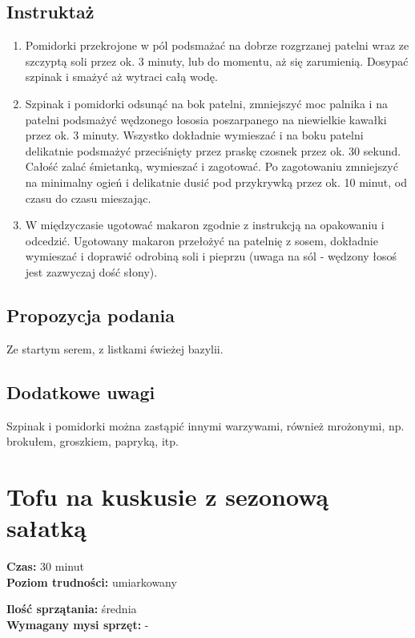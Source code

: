 \documentclass[a4paper,10pt]{book}
\begin{document}
\subsection*{Instruktaż} 
\begin{enumerate} 
    \item Pomidorki przekrojone w pól podsmażać na dobrze rozgrzanej patelni wraz ze szczyptą soli przez ok. 3 minuty, lub do momentu, aż się zarumienią. Dosypać szpinak i smażyć aż wytraci całą wodę.
    \item Szpinak i pomidorki odsunąć na bok patelni, zmniejszyć moc palnika i na patelni podsmażyć wędzonego łososia poszarpanego na niewielkie kawałki przez ok. 3 minuty. Wszystko dokładnie wymieszać i na boku patelni delikatnie podsmażyć przeciśnięty przez praskę czosnek przez ok. 30 sekund. Całość zalać śmietanką, wymieszać i zagotować. Po zagotowaniu zmniejszyć na minimalny ogień i delikatnie dusić pod przykrywką przez ok. 10 minut, od czasu do czasu mieszając. 
    \item W międzyczasie ugotować makaron zgodnie z instrukcją na opakowaniu i odcedzić. Ugotowany makaron przełożyć na patelnię z sosem, dokładnie wymieszać i doprawić odrobiną soli i pieprzu (uwaga na sól - wędzony łosoś jest zazwyczaj dość słony).
\end{enumerate}

\vspace{0.5cm}

\small 
\subsection*{Propozycja podania} Ze startym serem, z listkami świeżej bazylii.

\vspace{0.3cm}

\subsection*{Dodatkowe uwagi} Szpinak i pomidorki można zastąpić innymi warzywami, również mrożonymi, np. brokułem, groszkiem, papryką, itp.

\newpage 

\section{Tofu na kuskusie z sezonową sałatką}
\bigskip
\small
\begin{minipage}{0.45\textwidth}
    \noindent \textbf{Czas:} 30 minut \\
    \textbf{Poziom trudności:} umiarkowany
\end{minipage}
\begin{minipage}{0.45\textwidth}
    \noindent \textbf{Ilość sprzątania:} średnia\\
    \textbf{Wymagany mysi sprzęt:} -
\end{minipage}
\normalsize
\vspace{0.5cm}
\end{document}
